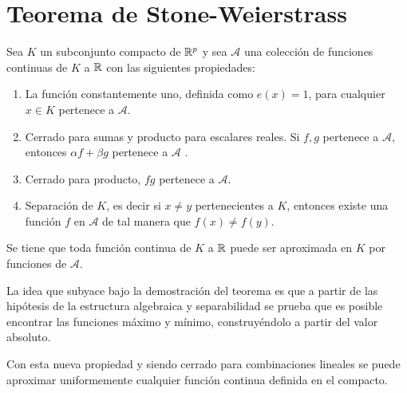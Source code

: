 %

\section{Teorema de Stone-Weierstrass }\label{ch:TeoremaStoneWeiertrass}

\begin{teorema}

    Sea $K$ un subconjunto compacto de $\mathbb{R}^p$ y sea $\mathcal{A}$ una colección de 
    funciones continuas de $K$ a $\mathbb{R}$ con las siguientes propiedades: 

    \begin{enumerate}
        \item La función constantemente uno, definida como $e(x)=1$, para cualquier $x\in K$ pertenece a $\mathcal{A}$.
        \item Cerrado para sumas y producto para escalares reales. Si $f,g$ pertenece a  $\mathcal{A}$, entonces $\alpha f + \beta g$ pertenece a $\mathcal{A}$ . 
        \item Cerrado para producto, $fg$ pertenece a $\mathcal{A}$. 
        \item Separación de $K$, es decir si $x \neq y$ pertenecientes a $K$, entonces existe una función $f$ en $\mathcal{A}$  de tal manera que $f(x) \neq f(y)$. 
    \end{enumerate}
    
    Se tiene que toda función continua de $K$ a $\mathbb{R}$ puede ser aproximada en $K$ por funciones de $\mathcal A$. 

\end{teorema}  

La idea que subyace bajo la demostración del teorema es que a partir de las hipótesis de la estructura algebraica y separabilidad se prueba que es posible encontrar las funciones máximo y mínimo, construyéndolo a partir del valor absoluto.   

Con esta nueva propiedad y siendo cerrado para combinaciones lineales se puede aproximar uniformemente cualquier función continua definida en el compacto. 

